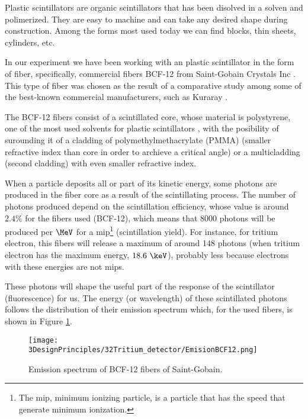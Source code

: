 Plastic scintillators are organic scintillators that has been disolved in a solven and polimerized. They are easy to machine and can take any desired shape during construction. Among the forms most used today we can find blocks, thin sheets, cylinders, etc.

In our experiment we have been working with an plastic scintillator in the form of fiber, specifically, commercial fibers BCF-12 from Saint-Gobain Crystals Inc \cite{DataSheetBCF12Fiber}. This type of fiber was chosen as the result of a comparative study \cite{TFGAlberto} among some of the best-known commercial manufacturers, such as Kuraray \cite{DataSheetKuraray}. 

The BCF-12 fibers consist of a scintillated core, whose material is polystyrene, one of the most used solvents for plastic scintillators \cite{Knoll}, with the posibility of surounding it of a cladding of polymethylmethacrylate (PMMA) (smaller refractive index than core in order to archieve a critical angle) or a multicladding (second cladding) with even smaller refractive index.

When a particle deposits all or part of its kinetic energy, some photons are produced in the fiber core as a result of the scintillating process. The number of photons produced depend on the scintillation efficiency, whose value is around $2.4\%$ for the fibers used (BCF-12), which means that $8000$ photons will be produced per $\MeV$ for a mip\footnote{The mip, minimum ionizing particle, is a particle that has the speed that generate minimum ionization.} (scintillation yield). For instance, for tritium electron, this fibers will release a maximum of around 148 photons (when tritium electron has the maximum energy, $18.6~\keV$), probably less because electrons with these energies are not mips.

These photons will shape the useful part of the response of the scintillator (fluorescence) for us. The energy (or wavelength) of these scintillated photons follows the distribution of their emission spectrum which, for the used fibers, is shown in Figure \ref{fig:EmissionSpectrumFibers}.

\begin{figure}[htbp]
\centering
\texttt{[image: 3DesignPrinciples/32Tritium\_detector/EmisionBCF12.png]}
\caption{Emission spectrum of BCF-12 fibers of Saint-Gobain.\label{fig:EmissionSpectrumFibers}~\cite{DataSheetBCF12Fiber}}
\end{figure}

